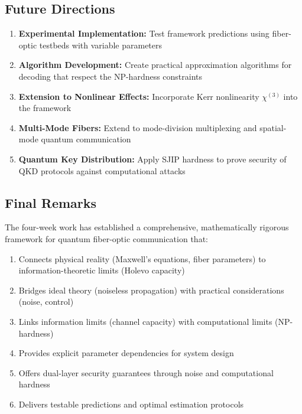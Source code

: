 \documentclass[12pt]{article}
\begin{document}
\subsection{Future Directions}

\begin{enumerate}
    \item \textbf{Experimental Implementation:} Test framework predictions using fiber-optic testbeds with variable parameters
    
    \item \textbf{Algorithm Development:} Create practical approximation algorithms for decoding that respect the NP-hardness constraints
    
    \item \textbf{Extension to Nonlinear Effects:} Incorporate Kerr nonlinearity \(\chi^{(3)}\) into the framework
    
    \item \textbf{Multi-Mode Fibers:} Extend to mode-division multiplexing and spatial-mode quantum communication
    
    \item \textbf{Quantum Key Distribution:} Apply SJIP hardness to prove security of QKD protocols against computational attacks
\end{enumerate}

\subsection{Final Remarks}

The four-week work has established a comprehensive, mathematically rigorous framework for quantum fiber-optic communication that:

\begin{enumerate}
    \item Connects physical reality (Maxwell's equations, fiber parameters) to information-theoretic limits (Holevo capacity)
    \item Bridges ideal theory (noiseless propagation) with practical considerations (noise, control)
    \item Links information limits (channel capacity) with computational limits (NP-hardness)
    \item Provides explicit parameter dependencies for system design
    \item Offers dual-layer security guarantees through noise and computational hardness
    \item Delivers testable predictions and optimal estimation protocols
\end{enumerate}
\end{document}
